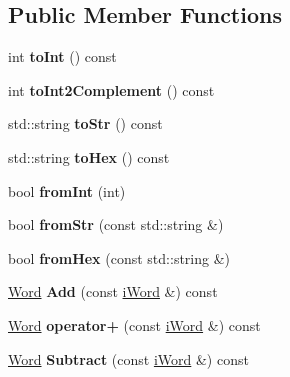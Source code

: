 \subsection*{Public Member Functions}
\begin{DoxyCompactItemize}
\item 
\hypertarget{classWord_a19303d963626549830a8da33d863bd6d}{
int {\bfseries toInt} () const }
\label{classWord_a19303d963626549830a8da33d863bd6d}

\item 
\hypertarget{classWord_a3d771d68afd4a70d279af8bd9cd6bef9}{
int {\bfseries toInt2Complement} () const }
\label{classWord_a3d771d68afd4a70d279af8bd9cd6bef9}

\item 
\hypertarget{classWord_ac2ca49ef4da2fb57172fe057849e53fa}{
std::string {\bfseries toStr} () const }
\label{classWord_ac2ca49ef4da2fb57172fe057849e53fa}

\item 
\hypertarget{classWord_ab797467868642bb096bc4c9b1ed0a2f0}{
std::string {\bfseries toHex} () const }
\label{classWord_ab797467868642bb096bc4c9b1ed0a2f0}

\item 
\hypertarget{classWord_ad6499f93b487d6d550a3fd4adcee9c8d}{
bool {\bfseries fromInt} (int)}
\label{classWord_ad6499f93b487d6d550a3fd4adcee9c8d}

\item 
\hypertarget{classWord_a614b52f3312d82ac5681403651040714}{
bool {\bfseries fromStr} (const std::string \&)}
\label{classWord_a614b52f3312d82ac5681403651040714}

\item 
\hypertarget{classWord_a4e26eb82e8f7426dd46be2bbec9e41c5}{
bool {\bfseries fromHex} (const std::string \&)}
\label{classWord_a4e26eb82e8f7426dd46be2bbec9e41c5}

\item 
\hypertarget{classWord_a5cb9115a6cee6666e88390e56eb32071}{
\hyperlink{classWord}{Word} {\bfseries Add} (const \hyperlink{classiWord}{iWord} \&) const }
\label{classWord_a5cb9115a6cee6666e88390e56eb32071}

\item 
\hypertarget{classWord_a88e945efd81d13e15adb1ed9e4e95a5a}{
\hyperlink{classWord}{Word} {\bfseries operator+} (const \hyperlink{classiWord}{iWord} \&) const }
\label{classWord_a88e945efd81d13e15adb1ed9e4e95a5a}

\item 
\hypertarget{classWord_a3ef457fb6f6ce54f5e98a83db4ae4472}{
\hyperlink{classWord}{Word} {\bfseries Subtract} (const \hyperlink{classiWord}{iWord} \&) const }
\label{classWord_a3ef457fb6f6ce54f5e98a83db4ae4472}


\end{DoxyCompactItemize}

